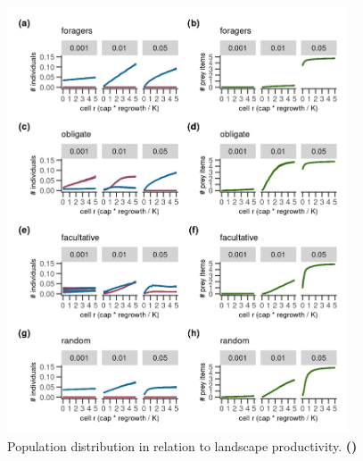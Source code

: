 \documentclass[11pt]{article}
\begin{document}
\begin{figure}[h!]
    \centering
    \includegraphics[width=0.90\textwidth]{figures/fig_05_agent_distribution.png}
    \caption{Population distribution in relation to landscape productivity.
    \textbf{()}}
    \label{Fig:AgentDistribution}
\end{figure}



\renewcommand{\figurename}{Video} 
\setcounter{figure}{0}

\end{document}
